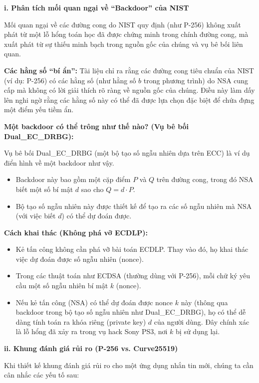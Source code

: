 \textbf{i. Phân tích mối quan ngại về ``Backdoor'' của NIST}

Mối quan ngại về các đường cong do NIST quy định (như P-256) không xuất phát từ một lỗ hổng toán học đã được chứng minh trong chính đường cong, mà xuất phát từ sự thiếu minh bạch trong nguồn gốc của chúng và vụ bê bối liên quan.

\textbf{Các hằng số ``bí ẩn'':} Tài liệu chỉ ra rằng các đường cong tiêu chuẩn của NIST (ví dụ: P-256) có các hằng số (như hằng số $b$ trong phương trình) do NSA cung cấp mà không có lời giải thích rõ ràng về nguồn gốc của chúng. Điều này làm dấy lên nghi ngờ rằng các hằng số này có thể đã được lựa chọn đặc biệt để chứa đựng một điểm yếu tiềm ẩn.

\textbf{Một backdoor có thể trông như thế nào? (Vụ bê bối Dual\_EC\_DRBG):}

Vụ bê bối Dual\_EC\_DRBG (một bộ tạo số ngẫu nhiên dựa trên ECC) là ví dụ điển hình về một backdoor như vậy.

\begin{itemize}
    \item Backdoor này bao gồm một cặp điểm $P$ và $Q$ trên đường cong, trong đó NSA biết một số bí mật $d$ sao cho $Q = d \cdot P$.
    \item Bộ tạo số ngẫu nhiên này được thiết kế để tạo ra các số ngẫu nhiên mà NSA (với việc biết $d$) có thể dự đoán được.
\end{itemize}

\textbf{Cách khai thác (Không phá vỡ ECDLP):}

\begin{itemize}
    \item Kẻ tấn công không cần phá vỡ bài toán ECDLP. Thay vào đó, họ khai thác việc dự đoán được số ngẫu nhiên (nonce).
    \item Trong các thuật toán như ECDSA (thường dùng với P-256), mỗi chữ ký yêu cầu một số ngẫu nhiên bí mật $k$ (nonce).
    \item Nếu kẻ tấn công (NSA) có thể dự đoán được nonce $k$ này (thông qua backdoor trong bộ tạo số ngẫu nhiên như Dual\_EC\_DRBG), họ có thể dễ dàng tính toán ra khóa riêng (private key) $d$ của người dùng. Đây chính xác là lỗ hổng đã xảy ra trong vụ hack Sony PS3, nơi $k$ bị sử dụng lại.
\end{itemize}

\textbf{ii. Khung đánh giá rủi ro (P-256 vs. Curve25519)}

Khi thiết kế khung đánh giá rủi ro cho một ứng dụng nhắn tin mới, chúng ta cần cân nhắc các yếu tố sau:

